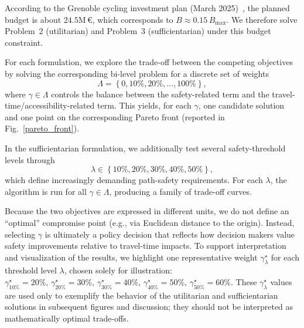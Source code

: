 \documentclass[lettersize,journal]{IEEEtran}
\begin{document}

According to the Grenoble cycling investment plan (March 2025)~\cite{GrenobleMetropole2025}, the planned budget is about
$24.5$M\,€, which corresponds to $B \approx 0.15\,B_{\max}$.
We therefore solve Problem~2 (utilitarian) and Problem~3 (sufficientarian) under this budget constraint.

For each formulation, we explore the trade-off between the competing objectives by solving the corresponding bi-level problem for a discrete set of weights
\[
\Lambda=\left\{0,\mathrm{10\%},\mathrm{20\%},\ldots, \mathrm{100\%}\right\},
\]
where $\gamma\in\Lambda$ controls the balance between the safety-related term and the travel-time/accessibility-related term.
This yields, for each $\gamma$, one candidate solution and one point on the corresponding Pareto front (reported in Fig.~\ref{pareto_front}).

In the sufficientarian formulation, we additionally test several safety-threshold levels through
\[
\lambda\in\left\{\mathrm{10\%},\mathrm{20\%},\mathrm{30\%},\mathrm{40\%},\mathrm{50\%}\right\},
\]
which define increasingly demanding path-safety requirements.
For each $\lambda$, the algorithm is run for all $\gamma\in\Lambda$, producing a family of trade-off curves.

Because the two objectives are expressed in different units, we do not define an ``optimal'' compromise point (e.g., via Euclidean distance to the origin).
Instead, selecting $\gamma$ is ultimately a policy decision that reflects how decision makers value safety improvements relative to travel-time impacts.
To support interpretation and visualization of the results, we highlight one representative weight $\gamma_\lambda^\star$ for each threshold level $\lambda$,
chosen solely for illustration: $
\gamma^\star_{\mathrm{10\%}}=\mathrm{20\%},\,
\gamma^\star_{\mathrm{20\%}}=\mathrm{30\%},\,
\gamma^\star_{\mathrm{30\%}}=\mathrm{40\%},\,
\gamma^\star_{\mathrm{40\%}}=\mathrm{50\%},\,
\gamma^\star_{\mathrm{50\%}}=\mathrm{60\%}.$ These $\gamma_\lambda^\star$ values are used only to exemplify the behavior of the utilitarian and sufficientarian solutions in subsequent figures and discussion;
they should not be interpreted as mathematically optimal trade-offs.
\end{document}
